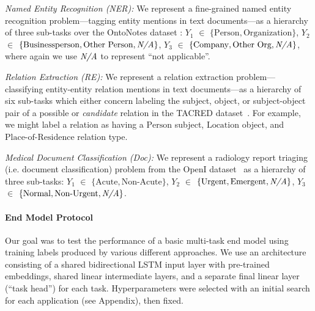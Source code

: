 \documentclass[letterpaper]{article}
\begin{document}
\textit{Named Entity Recognition (NER):}
We represent a fine-grained named entity recognition problem---tagging entity mentions in text documents---as a hierarchy of three sub-tasks over the OntoNotes dataset \cite{weischedel2011ontonotes}: $Y_1$ $\in$ $\{\text{Person}, \text{Organization}\}$, $Y_2$ $\in$ $\{\text{Businessperson}, \text{Other Person}, \text{\textit{N/A}}\}$, $Y_3$ $\in$ $\{\text{Company}, \text{Other Org}, \text{\textit{N/A}}\}$, where again we use $\text{\textit{N/A}}$ to represent ``not applicable''.

\textit{Relation Extraction (RE):}
We represent a relation extraction problem---classifying entity-entity relation mentions in text documents---as a hierarchy of six sub-tasks which either concern labeling the subject, object, or subject-object pair of a possible or \textit{candidate} relation in the TACRED dataset~\cite{zhang2017position}.
For example, we might label a relation as having a $\text{Person}$ subject, $\text{Location}$ object, and $\text{Place-of-Residence}$ relation type.

\textit{Medical Document Classification (Doc):}
We represent a radiology report triaging (i.e. document classification) problem from the OpenI dataset~\cite{NationalInstitutesofHealth2017Open-i:Engine} as a hierarchy of three sub-tasks: $Y_1$ $\in$ $\{\text{Acute}, \text{Non-Acute}\}$, $Y_2$ $\in$ $\{\text{Urgent}, \text{Emergent}, \text{\textit{N/A}}\}$, $Y_3$ $\in$ $\{\text{Normal}, \text{Non-Urgent}, \text{\textit{N/A}}\}$.

\paragraph*{End Model Protocol}
Our goal was to test the performance of a basic multi-task end model using training labels produced by various different approaches.
We use an architecture consisting of a shared bidirectional LSTM input layer
with pre-trained embeddings, shared linear intermediate layers, and a separate final linear layer (``task head'') for each task.
Hyperparameters were selected with an initial search for each application (see Appendix), then fixed.
\end{document}
